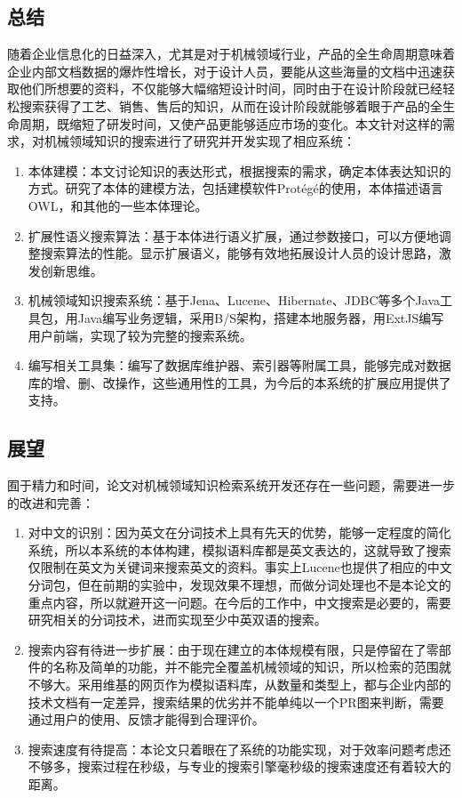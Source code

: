 \documentclass[12pt,a4paper]{article}
\begin{document}
\setcounter{figure}{0}
\setcounter{table}{0}
\setcounter{equation}{0}
	\subsection{总结}
	随着企业信息化的日益深入，尤其是对于机械领域行业，产品的全生命周期意味着企业内部文档数据的爆炸性增长，对于设计人员，要能从这些海量的文档中迅速获取他们所想要的资料，不仅能够大幅缩短设计时间，同时由于在设计阶段就已经轻松搜索获得了工艺、销售、售后的知识，从而在设计阶段就能够着眼于产品的全生命周期，既缩短了研发时间，又使产品更能够适应市场的变化。本文针对这样的需求，对机械领域知识的搜索进行了研究并开发实现了相应系统：
\begin{enumerate}[(1)]
	\item 本体建模：本文讨论知识的表达形式，根据搜索的需求，确定本体表达知识的方式。研究了本体的建模方法，包括建模软件{\Times Prot{\'e}g{\'e}}的使用，本体描述语言{\Times OWL}，和其他的一些本体理论。
	\item 扩展性语义搜索算法：基于本体进行语义扩展，通过参数接口，可以方便地调整搜索算法的性能。显示扩展语义，能够有效地拓展设计人员的设计思路，激发创新思维。
	\item 机械领域知识搜索系统：基于{\Times Jena}、{\Times Lucene}、{\Times Hibernate}、{\Times JDBC}等多个{\Times Java}工具包，用{\Times Java}编写业务逻辑，采用{\Times B/S}架构，搭建本地服务器，用{\Times ExtJS}编写用户前端，实现了较为完整的搜索系统。
	\item 编写相关工具集：编写了数据库维护器、索引器等附属工具，能够完成对数据库的增、删、改操作，这些通用性的工具，为今后的本系统的扩展应用提供了支持。
\end{enumerate}
	\subsection{展望}
	囿于精力和时间，论文对机械领域知识检索系统开发还存在一些问题，需要进一步的改进和完善：
\begin{enumerate}[(1)]
	\item 对中文的识别：因为英文在分词技术上具有先天的优势，能够一定程度的简化系统，所以本系统的本体构建，模拟语料库都是英文表达的，这就导致了搜索仅限制在英文为关键词来搜索英文的资料。事实上Lucene也提供了相应的中文分词包，但在前期的实验中，发现效果不理想，而做分词处理也不是本论文的重点内容，所以就避开这一问题。在今后的工作中，中文搜索是必要的，需要研究相关的分词技术，进而实现至少中英双语的搜索。
	\item 搜索内容有待进一步扩展：由于现在建立的本体规模有限，只是停留在了零部件的名称及简单的功能，并不能完全覆盖机械领域的知识，所以检索的范围就不够大。采用维基的网页作为模拟语料库，从数量和类型上，都与企业内部的技术文档有一定差异，搜索结果的优劣并不能单纯以一个PR图来判断，需要通过用户的使用、反馈才能得到合理评价。
	\item 搜索速度有待提高：本论文只着眼在了系统的功能实现，对于效率问题考虑还不够多，搜索过程在秒级，与专业的搜索引擎毫秒级的搜索速度还有着较大的距离。
\end{enumerate}
\newpage	
\renewcommand\listfigurename{图片索引}
\renewcommand\listtablename{表格索引}
\listoffigures
\end{document}
